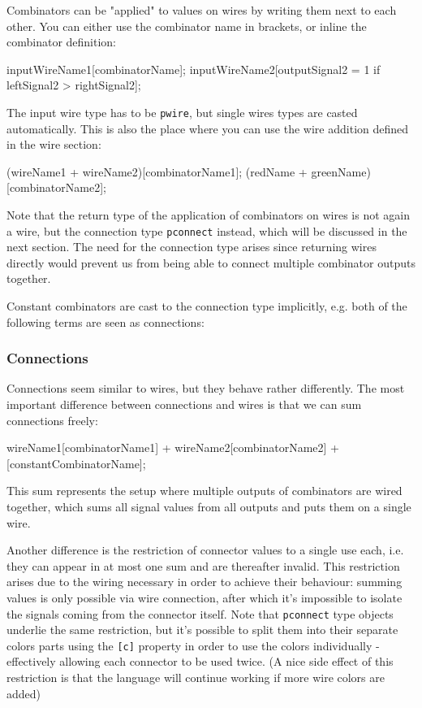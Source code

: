 \documentclass[landscape]{article}
\theoremstyle{plain}
\theoremstyle{definition}
\begin{document}
Combinators can be "applied" to values on wires by writing them next to each other. You can either use the combinator name in brackets, or inline the combinator definition:
\begin{langname}
inputWireName1[combinatorName];
inputWireName2[outputSignal2 = 1 if leftSignal2 > rightSignal2];
\end{langname}
The input wire type has to be \texttt{pwire}, but single wires types are casted automatically. This is also the place where you can use the wire addition defined in the wire section:
\begin{langname}
(wireName1 + wireName2)[combinatorName1];
(redName + greenName)[combinatorName2];
\end{langname}
Note that the return type of the application of combinators on wires is not again a wire, but the connection type \texttt{pconnect} instead, which will be discussed in the next section. The need for the connection type arises since returning wires directly would prevent us from being able to connect multiple combinator outputs together.

Constant combinators are cast to the connection type implicitly, e.g. both of the following terms are seen as connections:
\begin{langname}
[ signal1 = 123, signal2 = -5 ]
[constantCombinatorName]
\end{langname}
\subsubsection{Connections}
Connections seem similar to wires, but they behave rather differently. The most important difference between connections and wires is that we can sum connections freely:
\begin{langname}
wireName1[combinatorName1] + wireName2[combinatorName2] + [constantCombinatorName];
\end{langname}
This sum represents the setup where multiple outputs of combinators are wired together, which sums all signal values from all outputs and puts them on a single wire. 

Another difference is the restriction of connector values to a single use each, i.e. they can appear in at most one sum and are thereafter invalid. This restriction arises due to the wiring necessary in order to achieve their behaviour: summing values is only possible via wire connection, after which it's impossible to isolate the signals coming from the connector itself. Note that \texttt{pconnect} type objects underlie the same restriction, but it's possible to split them into their separate colors parts using the \texttt{[c]} property in order to use the colors individually - effectively allowing each connector to be used twice. (A nice side effect of this restriction is that the language will continue working if more wire colors are added)
\end{document}
